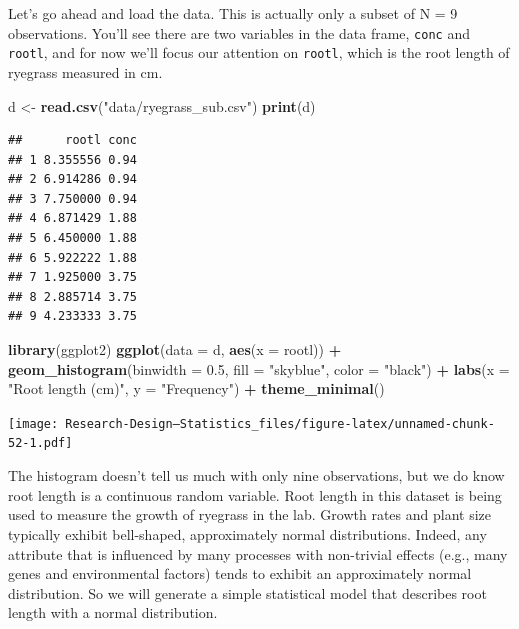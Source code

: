 \documentclass[
]{book}
\newenvironment{Shaded}{\begin{snugshade}}{\end{snugshade}}
\newcommand{\AttributeTok}[1]{\textcolor[rgb]{0.13,0.29,0.53}{#1}}
\newcommand{\FloatTok}[1]{\textcolor[rgb]{0.00,0.00,0.81}{#1}}
\newcommand{\FunctionTok}[1]{\textcolor[rgb]{0.13,0.29,0.53}{\textbf{#1}}}
\newcommand{\NormalTok}[1]{#1}
\newcommand{\OtherTok}[1]{\textcolor[rgb]{0.56,0.35,0.01}{#1}}
\newcommand{\SpecialCharTok}[1]{\textcolor[rgb]{0.81,0.36,0.00}{\textbf{#1}}}
\newcommand{\StringTok}[1]{\textcolor[rgb]{0.31,0.60,0.02}{#1}}
\begin{document}
Let's go ahead and load the data. This is actually only a subset of N = 9 observations. You'll see there are two variables in the data frame, \texttt{conc} and \texttt{rootl}, and for now we'll focus our attention on \texttt{rootl}, which is the root length of ryegrass measured in cm.

\begin{Shaded}
\begin{Highlighting}[]
\NormalTok{d }\OtherTok{\textless{}{-}} \FunctionTok{read.csv}\NormalTok{(}\StringTok{"data/ryegrass\_sub.csv"}\NormalTok{)}
\FunctionTok{print}\NormalTok{(d)}
\end{Highlighting}
\end{Shaded}

\begin{verbatim}
##      rootl conc
## 1 8.355556 0.94
## 2 6.914286 0.94
## 3 7.750000 0.94
## 4 6.871429 1.88
## 5 6.450000 1.88
## 6 5.922222 1.88
## 7 1.925000 3.75
## 8 2.885714 3.75
## 9 4.233333 3.75
\end{verbatim}

\begin{Shaded}
\begin{Highlighting}[]
\FunctionTok{library}\NormalTok{(ggplot2)}
\FunctionTok{ggplot}\NormalTok{(}\AttributeTok{data =}\NormalTok{ d, }\FunctionTok{aes}\NormalTok{(}\AttributeTok{x =}\NormalTok{ rootl)) }\SpecialCharTok{+}
  \FunctionTok{geom\_histogram}\NormalTok{(}\AttributeTok{binwidth =} \FloatTok{0.5}\NormalTok{, }\AttributeTok{fill =} \StringTok{"skyblue"}\NormalTok{, }\AttributeTok{color =} \StringTok{"black"}\NormalTok{) }\SpecialCharTok{+}
  \FunctionTok{labs}\NormalTok{(}\AttributeTok{x =} \StringTok{"Root length (cm)"}\NormalTok{, }\AttributeTok{y =} \StringTok{"Frequency"}\NormalTok{) }\SpecialCharTok{+}
  \FunctionTok{theme\_minimal}\NormalTok{()}
\end{Highlighting}
\end{Shaded}

\texttt{[image: Research-Design---Statistics\_files/figure-latex/unnamed-chunk-52-1.pdf]}

The histogram doesn't tell us much with only nine observations, but we do know root length is a continuous random variable. Root length in this dataset is being used to measure the growth of ryegrass in the lab. Growth rates and plant size typically exhibit bell-shaped, approximately normal distributions. Indeed, any attribute that is influenced by many processes with non-trivial effects (e.g., many genes and environmental factors) tends to exhibit an approximately normal distribution. So we will generate a simple statistical model that describes root length with a normal distribution.
\end{document}
